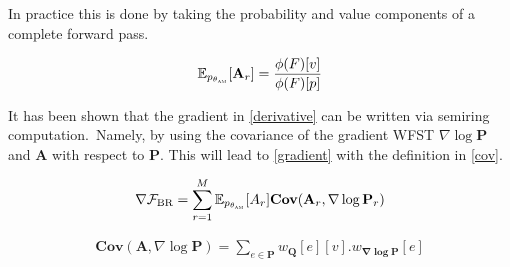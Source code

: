 \documentclass[a4paper,13.5pt]{extarticle}
\def\am{$\theta_{\scaleto{\text{AM}}{2pt}}$}
\begin{document}
	
	In practice this is done by taking the probability and value components of a complete forward pass. 
	
	\begin{align}
		\label{c}
		\mathbb{E}_{p_\text{\am}}[\mathbf{A}_r] = \frac{\phi(F)[v]}{\phi(F)[p]}
	\end{align}
	
	It has been shown that the gradient in \cref{derivative} can be written via semiring computation\cite{heigold2008modified}.\ Namely, by using the covariance of the gradient WFST $\nabla \log \mathbf{P}$ and $\mathbf{A}$ with respect to $\mathbf{P}$. This will lead to \cref{gradient} with the definition in \cref{cov}.\
	
	\begin{align}
		\label{gradient}
		\nabla \mathcal{F_{\text{BR}}} =   \sum_{r=1}^M \mathbb{E}_{p_\text{\am}}[A_r] \mathbf{Cov}(\mathbf{A}_r, \nabla \log \mathbf{P}_r)
	\end{align}
	
	
	
	\begin{align}
		\label{cov}
		\mathbf{Cov}(\mathbf{A},  \nabla \log \mathbf{P}) = \sum_{e \in \mathbf{P}} w_{\mathbf{Q}}[e][v]. w_{\mathbf{\nabla \log P}}[e]
	\end{align}
	
	
	
	
	
	
	
	
	
	
	
	
	
	
	
	
\end{document}
